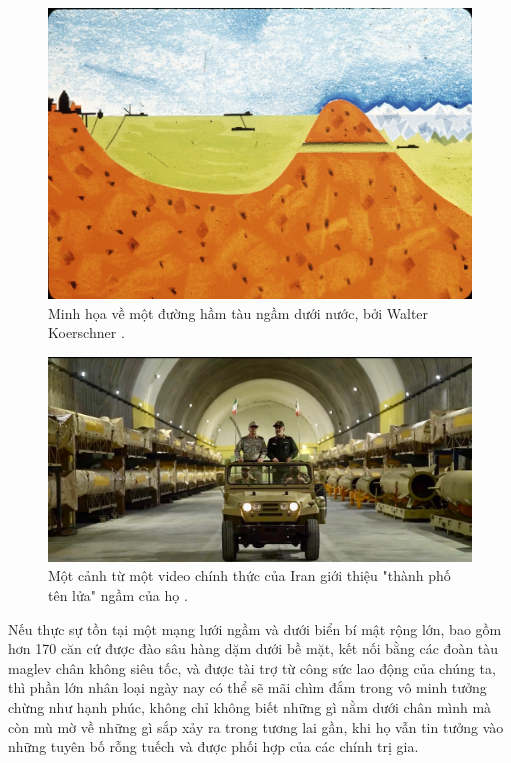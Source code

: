 \begin{figure}[t]
\begin{center}
   \includegraphics[width=1\linewidth]{sub.jpg}
\end{center}
   \caption{Minh họa về một đường hầm tàu ngầm dưới nước, bởi Walter Koerschner \cite{22,23}.}
\label{fig:6}
\label{fig:onecol}

\end{figure}

\begin{figure}[t]
\begin{center}
   \includegraphics[width=1\linewidth]{iran.jpeg}
\end{center}
   \caption{Một cảnh từ một video chính thức của Iran giới thiệu "thành phố tên lửa" ngầm của họ \cite{39,40}.}
\label{fig:12}
\label{fig:onecol}
\end{figure}

Nếu thực sự tồn tại một mạng lưới ngầm và dưới biển bí mật rộng lớn, bao gồm hơn 170 căn cứ được đào sâu hàng dặm dưới bề mặt, kết nối bằng các đoàn tàu maglev chân không siêu tốc, và được tài trợ từ công sức lao động của chúng ta, thì phần lớn nhân loại ngày nay có thể sẽ mãi chìm đắm trong vô minh tưởng chừng như hạnh phúc, không chỉ không biết những gì nằm dưới chân mình mà còn mù mờ về những gì sắp xảy ra trong tương lai gần, khi họ vẫn tin tưởng vào những tuyên bố rỗng tuếch và được phối hợp của các chính trị gia.

